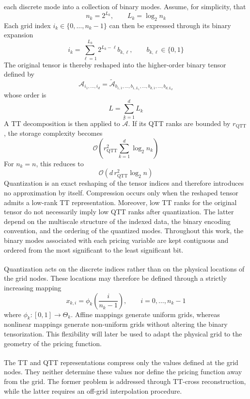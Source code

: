 \documentclass{article}
\numberwithin{equation}{subsection}
\theoremstyle{definition}
\theoremstyle{remark}
\begin{document}
each discrete mode into a collection of binary modes. Assume, for simplicity,
that
\begin{equation}
n_k=2^{L_k},
\qquad
L_k=\log_2 n_k
\end{equation}
Each grid index \(i_k\in\{0,\ldots,n_k-1\}\) can then be expressed through its
binary expansion
\begin{equation}
i_k
=
\sum_{\ell=1}^{L_k}
2^{L_k-\ell}b_{k,\ell},
\qquad
b_{k,\ell}\in\{0,1\}
\end{equation}
The original tensor is thereby reshaped into the higher-order binary tensor
defined by
\begin{equation}
\mathcal{A}_{i_1,\ldots,i_d}
=
\widetilde{\mathcal{A}}_{b_{1,1},\ldots,b_{1,L_1},
\ldots,b_{d,1},\ldots,b_{d,L_d}}
\end{equation}
whose order is
\begin{equation}
L
=
\sum_{k=1}^{d}L_k
\end{equation}
A TT decomposition is then applied to
\(\widetilde{\mathcal{A}}\). If its QTT ranks are bounded by
\(r_{\mathrm{QTT}}\), the storage complexity becomes
\begin{equation}
\mathcal{O}\!\left(
r_{\mathrm{QTT}}^2
\sum_{k=1}^{d}\log_2 n_k
\right)
\end{equation}
For \(n_k=n\), this reduces to
\begin{equation}
\mathcal{O}\!\left(
d\,r_{\mathrm{QTT}}^2\log_2 n
\right)
\end{equation}
Quantization is an exact reshaping of the tensor indices and therefore
introduces no approximation by itself. Compression occurs only when the
reshaped tensor admits a low-rank TT representation. Moreover, low TT ranks
for the original tensor do not necessarily imply low QTT ranks after
quantization. The latter depend on the multiscale structure of the indexed
data, the binary encoding convention, and the ordering of the quantized modes.
Throughout this work, the binary modes associated with each pricing variable
are kept contiguous and ordered from the most significant to the least
significant bit.\\
\\
Quantization acts on the discrete indices rather than on the physical
locations of the grid nodes. These locations may therefore be defined through
a strictly increasing mapping
\begin{equation}
x_{k,i}
=
\phi_k\!\left(
\frac{i}{n_k-1}
\right),
\qquad
i=0,\ldots,n_k-1
\label{eq:grid_nodes}
\end{equation}
where \(\phi_k:[0,1]\to\Theta_k\). Affine mappings generate uniform grids,
whereas nonlinear mappings generate non-uniform grids without altering the
binary tensorization. This flexibility will later be used to adapt the
physical grid to the geometry of the pricing function.\\
\\
The TT and QTT representations compress only the values defined at the grid
nodes. They neither determine these values nor define the pricing function
away from the grid. The former problem is addressed through TT-cross
reconstruction, while the latter requires an off-grid interpolation
procedure.
\end{document}
